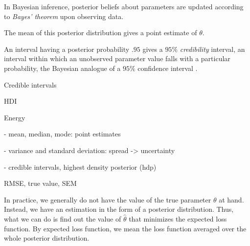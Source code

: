 
In Bayesian inference, posterior beliefs about parameters are updated according to \textit{Bayes' theorem} upon observing data.  

The mean of this posterior distribution gives a point estimate of $\theta$. 

An interval having a posterior probability $.95$ gives a $95\%$ \textit{credibility} interval, an interval within which an unobserved parameter value falls with a particular probability, the Bayesian analogue of a $95\%$ confidence interval \cite[p. 777]{STK}.

Credible intervals 

HDI 

Energy

- mean, median, mode: point estimates

- variance and standard deviation: spread -> uncertainty 

- credible intervals, highest density posterior (hdp) 


RMSE, true value, SEM 

In practice, we generally do not have the value of the true parameter $\theta$ at hand. Instead, we have an estimation in the form of a posterior distribution. Thus, what we can do is find out the value of $\hat{\theta}$ that minimizes the expected loss function. By expected loss function, we mean the loss function averaged over the whole posterior distribution. 







